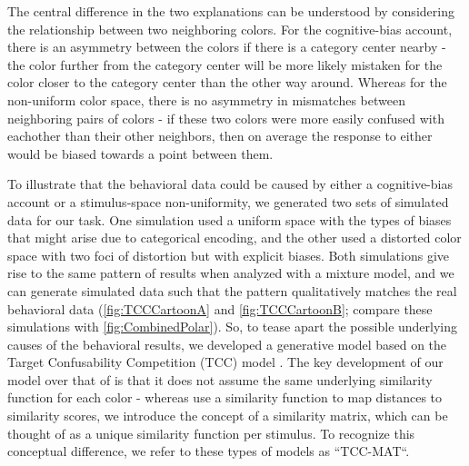 The central difference in the two explanations can be understood by considering the relationship between two neighboring colors. 
For the cognitive-bias account, there is an asymmetry between the colors if there is a category center nearby - the color further from the category center will be more likely mistaken for the color closer to the category center than the other way around. 
Whereas for the non-uniform color space, there is no asymmetry in mismatches between neighboring pairs of colors - if these two colors were more easily confused with eachother than their other neighbors, then on average the response to either would be biased towards a point between them.

To illustrate that the behavioral data could be caused by either a cognitive-bias account or a stimulus-space non-uniformity, we generated two sets of simulated data for our task. 
One simulation used a uniform space with the types of biases that might arise due to categorical encoding, and the other used a distorted color space with two foci of distortion but with explicit biases. 
Both simulations give rise to the same pattern of results when analyzed with a mixture model, and we can generate simulated data such that the pattern qualitatively matches the real behavioral data (\autoref{fig:TCCCartoonA} and \autoref{fig:TCCCartoonB}; compare these simulations with \autoref{fig:CombinedPolar}). 
So, to tease apart the possible underlying causes of the behavioral results, we developed a generative model based on the Target Confusability Competition (TCC) model%
. 
The key development of our model over that of \cite{schurgin_psychophysical_2020} is that it does not assume the same underlying similarity function for each color - whereas \cite{schurgin_psychophysical_2020} use a similarity function to map distances to similarity scores, we introduce the concept of a similarity matrix, which can be thought of as a unique similarity function per stimulus. 
To recognize this conceptual difference, we refer to these types of models as ``TCC-MAT``.

